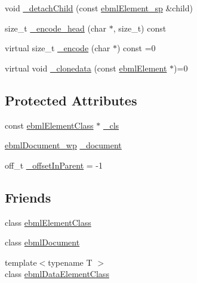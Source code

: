 \begin{DoxyCompactItemize}
\item 
void \mbox{\hyperlink{classebml_1_1ebmlElement_ae2e24c1aa8ef7bd93c1ec64573afaff1}{\+\_\+detach\+Child}} (const \mbox{\hyperlink{namespaceebml_adad533b7705a16bb360fe56380c5e7be}{ebml\+Element\+\_\+sp}} \&child)
\item 
size\+\_\+t \mbox{\hyperlink{classebml_1_1ebmlElement_a54744a82d2007dac6d8ee795786cc881}{\+\_\+encode\+\_\+head}} (char $\ast$, size\+\_\+t) const
\item 
virtual size\+\_\+t \mbox{\hyperlink{classebml_1_1ebmlElement_a27bd9de14e1706840235b68331917776}{\+\_\+encode}} (char $\ast$) const =0
\item 
virtual void \mbox{\hyperlink{classebml_1_1ebmlElement_a3ebe3aa75b62971f385c01f27c807a02}{\+\_\+clonedata}} (const \mbox{\hyperlink{classebml_1_1ebmlElement}{ebml\+Element}} $\ast$)=0
\end{DoxyCompactItemize}
\subsection*{Protected Attributes}
\begin{DoxyCompactItemize}
\item 
const \mbox{\hyperlink{classebml_1_1ebmlElementClass}{ebml\+Element\+Class}} $\ast$ \mbox{\hyperlink{classebml_1_1ebmlElement_a8599f2d1b37594d8ee97fc55e10d7c89}{\+\_\+cls}}
\item 
\mbox{\hyperlink{namespaceebml_acfead4f724a6f8d55c730c6fbd362cea}{ebml\+Document\+\_\+wp}} \mbox{\hyperlink{classebml_1_1ebmlElement_ab76c2988a2f78c3ab057a53ebdef38ba}{\+\_\+document}}
\item 
off\+\_\+t \mbox{\hyperlink{classebml_1_1ebmlElement_acd087ec13aeafbb0e854392273929431}{\+\_\+offset\+In\+Parent}} = -\/1
\end{DoxyCompactItemize}
\subsection*{Friends}
\begin{DoxyCompactItemize}
\item 
class \mbox{\hyperlink{classebml_1_1ebmlElement_a59f545ad07cbee7ac3e53dcc0f675c78}{ebml\+Element\+Class}}
\item 
class \mbox{\hyperlink{classebml_1_1ebmlElement_a2ba3e6ed636706dc72ed095aaa0051a7}{ebml\+Document}}
\item 
{\footnotesize template$<$typename T $>$ }\\class \mbox{\hyperlink{classebml_1_1ebmlElement_a1c651a685300ab8a612d148db28c6b1f}{ebml\+Data\+Element\+Class}}
\end{DoxyCompactItemize}


